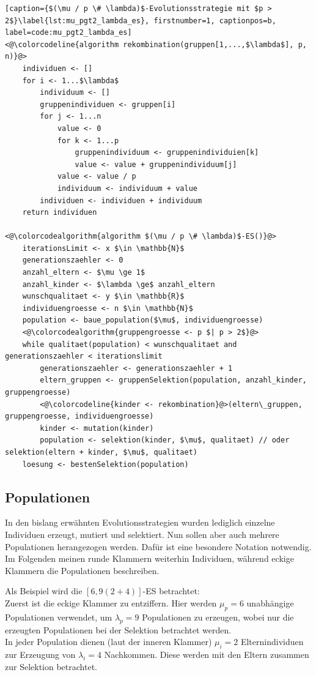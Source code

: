 \begin{lstlisting}[caption={$(\mu / p \# \lambda)$-Evolutionsstrategie mit $p > 2$}\label{lst:mu_pgt2_lambda_es}, firstnumber=1, captionpos=b, label=code:mu_pgt2_lambda_es]
<@\colorcodeline{algorithm rekombination(gruppen[1,...,$\lambda$], p, n)}@>
	individuen <- []
	for i <- 1...$\lambda$
		individuum <- []
		gruppenindividuen <- gruppen[i]
		for j <- 1...n
			value <- 0
			for k <- 1...p
				gruppenindividuum <- gruppenindividuien[k]
				value <- value + gruppenindividuum[j]
			value <- value / p
			individuum <- individuum + value
		individuen <- individuen + individuum
	return individuen

<@\colorcodealgorithm{algorithm $(\mu / p \# \lambda)$-ES()}@>
	iterationsLimit <- x $\in \mathbb{N}$
	generationszaehler <- 0
	anzahl_eltern <- $\mu \ge 1$
	anzahl_kinder <- $\lambda \ge$ anzahl_eltern
	wunschqualitaet <- y $\in \mathbb{R}$
	individuengroesse <- n $\in \mathbb{N}$
	population <- baue_population($\mu$, individuengroesse)
	<@\colorcodealgorithm{gruppengroesse <- p $| p > 2$}@>
	while qualitaet(population) < wunschqualitaet and generationszaehler < iterationslimit
		generationszaehler <- generationszaehler + 1
		eltern_gruppen <- gruppenSelektion(population, anzahl_kinder, gruppengroesse)
		<@\colorcodeline{kinder <- rekombination}@>(eltern\_gruppen, gruppengroesse, individuengroesse)
		kinder <- mutation(kinder)
		population <- selektion(kinder, $\mu$, qualitaet) // oder selektion(eltern + kinder, $\mu$, qualitaet)
	loesung <- bestenSelektion(population)
\end{lstlisting}

\subsection{Populationen}

In den bislang erwähnten Evolutionsstrategien wurden lediglich einzelne Individuen erzeugt, mutiert und selektiert.
Nun sollen aber auch mehrere Populationen herangezogen werden.
Dafür ist eine besondere Notation notwendig.
Im Folgenden meinen runde Klammern weiterhin Individuen, während eckige Klammern die Populationen beschreiben.

Als Beispiel wird die $[6,9(2+4)]$-ES betrachtet:\\
Zuerst ist die eckige Klammer zu entziffern. Hier werden $\mu_p = 6$ unabhängige Populationen verwendet, um  $\lambda_p = 9$ Populationen zu erzeugen, wobei nur die erzeugten Populationen bei der Selektion betrachtet werden.\\
In jeder Population dienen (laut der inneren Klammer) $\mu_i = 2$ Elternindividuen zur Erzeugung von $\lambda_i = 4$ Nachkommen. Diese werden mit den Eltern zusammen zur Selektion betrachtet.

